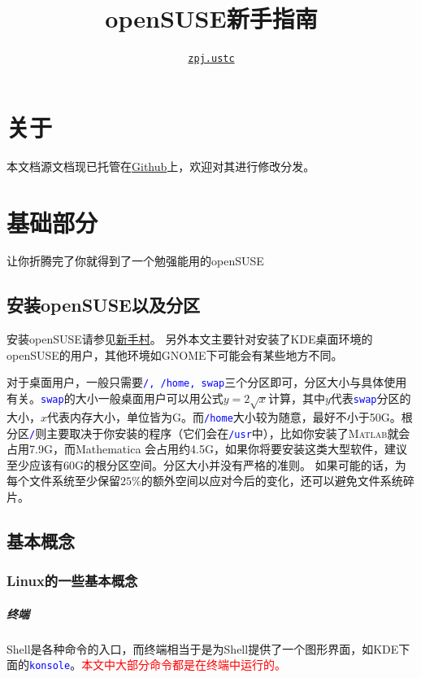 \documentclass[12pt,openany]{book}
\newcommand{\command}[1]{\texttt{\textcolor{blue}{#1}}}
\newcommand{\soft}[1]{\texttt{\textcolor{blue}{#1}}}
\begin{document}
\title{openSUSE新手指南}
\author{\href{mailto:zpj.ustc@gmail.com}{\texttt{zpj.ustc}}}
\maketitle
\chapter*{关于}


本文档源文档现已托管在\href{https://github.com/zpj-ustc/openSUSE-novice-guide}{Github}上，欢迎对其进行修改分发。
\newpage
\tableofcontents
\newpage


\chapter{基础部分}
让你折腾完了你就得到了一个勉强能用的openSUSE
\section{安装openSUSE以及分区}
安装openSUSE请参见\href{https://zh.opensuse.org/%E6%96%B0%E6%89%8B%E6%9D%91}{新手村}。
另外本文主要针对安装了KDE桌面环境的openSUSE的用户，其他环境如GNOME下可能会有某些地方不同。

对于桌面用户，一般只需要\command{/, /home, swap}三个分区即可，分区大小与具体使用有关。\command{swap}的大小一般桌面用户可以用公式$y=2\sqrt{x}$计算，其中$y$代表\command{swap}分区的大小，$x$代表内存大小，单位皆为G。而\command{/home}大小较为随意，最好不小于50G。根分区\command{/}则主要取决于你安装的程序（它们会在\command{/usr}中），比如你安装了\textsc{Matlab}就会占用7.9G，而Mathematica 会占用约4.5G，如果你将要安装这类大型软件，建议至少应该有60G的根分区空间。分区大小并没有严格的准则。
如果可能的话，为每个文件系统至少保留$25\%$的额外空间以应对今后的变化，还可以避免文件系统碎片。

\section{基本概念}
\subsection{Linux的一些基本概念}
\paragraph{终端} Shell是各种命令的入口，而终端相当于是为Shell提供了一个图形界面，如KDE下面的\soft{konsole}。\textcolor{red}{本文中大部分命令都是在终端中运行的。}
\end{document}
